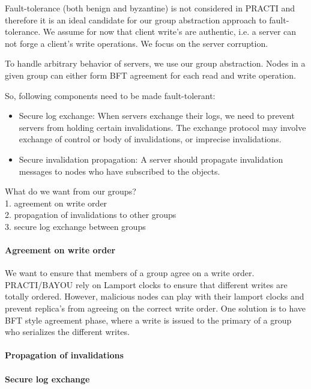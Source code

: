 Fault-tolerance (both benign and byzantine) is not considered in PRACTI and therefore it is an ideal candidate for our group abstraction approach to fault-tolerance. We assume for now that client write's are authentic, i.e. a server can not forge a client's write operations. We focus on the server corruption.

To handle arbitrary behavior of servers, we use our group abstraction. Nodes in a given group can either form BFT agreement for each read and write operation.

So, following components need to be made fault-tolerant:
\begin{itemize}
\item{Secure log exchange:} When servers exchange their logs, we need to prevent servers from holding certain invalidations. The exchange protocol may involve exchange of control or body of invalidations, or imprecise invalidations.
\item{Secure invalidation propagation:} A server should propagate invalidation messages to nodes who have subscribed to the objects.
\end{itemize}

What do we want from our groups?\\
1. agreement on write order\\
2. propagation of invalidations to other groups \\
3. secure log exchange between groups \\

\paragraph{Agreement on write order}
We want to ensure that members of a group agree on a write order. PRACTI/BAYOU rely on Lamport clocks to ensure that different writes are totally ordered. However, malicious nodes can play with their lamport clocks and prevent replica's from agreeing on the correct write order. One solution is to have BFT style agreement phase, where a write is issued to the primary of a group who serializes the different writes. 

\paragraph{Propagation of invalidations}

\paragraph{Secure log exchange}

